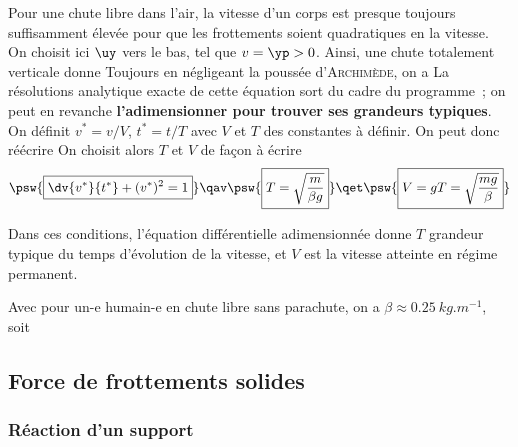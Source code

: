 \documentclass[../../main/main.tex]{subfiles}
\begin{document}
Pour une chute libre dans l'air, la vitesse d'un corps est presque toujours
suffisamment élevée pour que les frottements soient quadratiques en la vitesse.
On choisit ici $\uy$ vers le bas, tel que $v = \yp > 0$. Ainsi, une chute
totalement verticale donne
\psw{
	\[\Ff_f = -\beta\yp^2\uy\]
}
Toujours en négligeant la poussée d'\textsc{Archimède}, on a
\psw{
	\[\dv{v}{t} + \frac{\beta}{m}v^2 = g\]
}
La résolutions analytique exacte de cette équation sort du cadre du programme~;
on peut en revanche \textbf{l'adimensionner pour trouver ses grandeurs typiques}.
On définit $v^* = v/V$, $t^* = t/T$ avec $V$ et $T$ des constantes à définir. On
peut donc réécrire
On choisit alors $T$ et $V$ de façon à écrire
\begin{gather*}
	\psw{\boxed{\dv{v^*}{t^*} + (v^*)^2 = 1}}
	\qav
	\psw{\boxed{T = \sqrt{\frac{m}{\beta g}}}}
	\qet
	\psw{\boxed{V = gT = \sqrt{\frac{mg}{\beta}}}}
\end{gather*}

Dans ces conditions, l'équation différentielle adimensionnée donne $T$ grandeur
typique du temps d'évolution de la vitesse, et $V$ est la vitesse atteinte en
régime permanent.

Avec pour un-e humain-e en chute libre sans parachute, on a
$\beta \approx \SI{0.25}{kg.m^{-1}}$, soit
\psw{
	\[
		\boxed{v_{\lim} = \SI{60}{m.s^{-1} \approx \SI{200}{km.h^{-1}}}}
		\qet
		\boxed{T \approx \SI{6}{s}}
	\]
}


\subsection{Force de frottements solides}
\subsubsection{Réaction d'un support}
\end{document}
